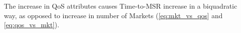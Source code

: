 \documentclass[10pt,journal,compsoc]{IEEEtran}
\begin{document}
The increase in QoS attributes causes Time-to-MSR increase in a biquadratic way, as opposed to increase in number of Markets (\autoref{eq:mkt_vs_qos} and \autoref{eq:qos_vs_mkt}). 


	
\end{document}

